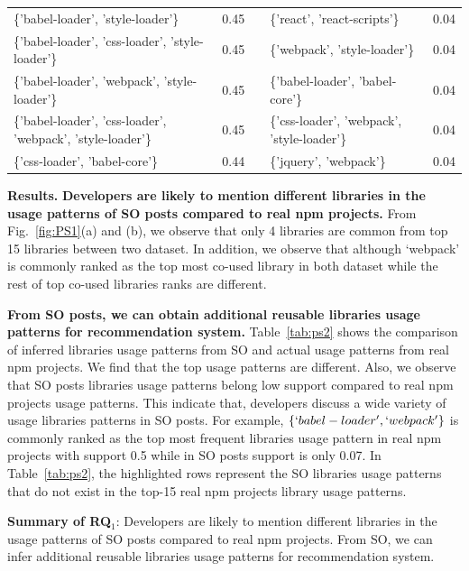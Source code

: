 \documentclass[paper]{ieice}
\begin{document}
\begin{table}[t]
\begin{tabular}{@{}lc|llc@{}}
\{'babel-loader', 'style-loader'\} & 0.45 &  & \cellcolor[HTML]{999999}\{'react', 'react-scripts'\} & 0.04 \\
\{'babel-loader', 'css-loader', 'style-loader'\} & 0.45 &  & \{'webpack', 'style-loader'\} & 0.04 \\
\{'babel-loader', 'webpack', 'style-loader'\} & 0.45 &  & \{'babel-loader', 'babel-core'\} & 0.04 \\
\{'babel-loader', 'css-loader', 'webpack', 'style-loader'\} & 0.45 &  & \{'css-loader', 'webpack', 'style-loader'\} & 0.04 \\
\{'css-loader', 'babel-core'\} & 0.44 &  & \cellcolor[HTML]{999999}\{'jquery', 'webpack'\} & 0.04 \\ \bottomrule
\end{tabular}%
\end{table}


\noindent\textbf{Results. }\textbf{Developers are likely to mention different libraries in the  usage patterns of SO posts compared to real npm projects.} From Fig.~\ref{fig:PS1}(a) and (b), we observe that only 4 libraries are common from top 15 libraries between two dataset. 
In addition, we observe that although `webpack' is commonly ranked as the top most co-used library in both dataset while the rest of top co-used libraries ranks are different.

\textbf{From SO posts, we can obtain additional reusable libraries usage patterns for recommendation system.} Table~\ref{tab:ps2} shows the comparison of inferred libraries usage patterns from SO and actual usage patterns from real npm projects.  We find that the top usage patterns are different. Also, we observe that SO posts libraries usage patterns belong low support compared to real npm projects usage patterns. This indicate that, developers discuss a wide variety of usage libraries patterns in SO posts. For example, $\{`babel-loader', `webpack' \}$ is commonly ranked as the top most frequent libraries usage pattern in real npm projects with support 0.5 while in SO posts support is only 0.07.  In Table~\ref{tab:ps2}, the highlighted rows represent the SO libraries usage patterns that do not exist in the top-15 real npm projects library usage patterns.

\begin{tcolorbox}
    \textbf{Summary of RQ$_1$}: 
    Developers are likely to mention different libraries in the usage patterns of SO posts compared to real npm projects. From SO, we can infer additional reusable libraries usage patterns for recommendation system.
\end{tcolorbox}
\end{document}
